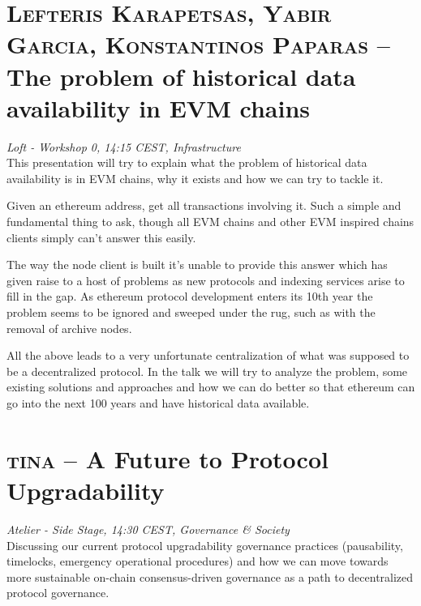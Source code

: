 \section {\textsc{Lefteris Karapetsas, Yabir Garcia, Konstantinos Paparas} -- The problem of historical data availability in EVM chains
} \noindent \textit {Loft - Workshop 0, 14:15 CEST, Infrastructure
}\\[1em] This presentation will try to explain what the problem of historical data availability is in EVM chains, why it exists and how we can try to tackle it.
\par Given an ethereum address, get all transactions involving it. Such a simple and fundamental thing to ask, though all EVM chains and other EVM inspired chains clients simply can't answer this easily.

The way the node client is built it's unable to provide this answer which has given raise to a host of problems as new protocols and indexing services arise to fill in the gap. As ethereum protocol development enters its 10th year the problem seems to be ignored and sweeped under the rug, such as with the removal of archive nodes.

All the above leads to a very unfortunate centralization of what was supposed to be a decentralized protocol. In the talk we will try to analyze the problem, some existing solutions and approaches and how we can do better so that ethereum can go into the next 100 years and have historical data available.
\clearpage
\section {\textsc{tina} -- A Future to Protocol Upgradability
} \noindent \textit {Atelier - Side Stage, 14:30 CEST, Governance \&
 Society
}\\[1em] Discussing our current protocol upgradability governance practices (pausability, timelocks, emergency operational procedures) and how we can move towards more sustainable on-chain consensus-driven governance as a path to decentralized protocol governance.
\par \clearpage
